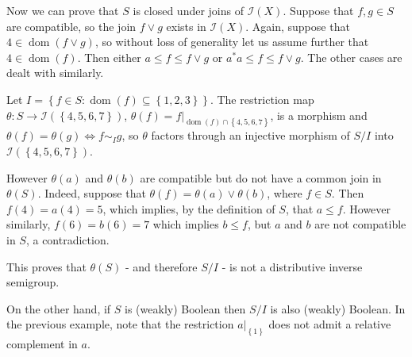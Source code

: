 \begin{example}
Now we can prove that $S$ is closed under joins of $\mathcal{I}(X)$. Suppose that $f,g\in S$ are compatible, so the join $f\lor g$ exists in $\mathcal{I}(X)$. Again, suppose that $4\in\operatorname{dom}(f\lor g)$, so without loss of generality let us assume further that $4\in\operatorname{dom}(f)$. Then either $a\leq f\leq f\lor g$ or $a^*a\leq f\leq f\lor g$. The other cases are dealt with similarly.

Let $I=\left\{f\in S:\operatorname{dom}(f)\subseteq\left\{1,2,3\right\}\right\}$. The restriction map $\theta:S\to\mathcal{I}(\left\{4,5,6,7\right\})$, $\theta(f)=f|_{\operatorname{dom}(f)\cap\left\{4,5,6,7\right\}}$, is a morphism and $\theta(f)=\theta(g)\iff f\sim_I g$, so $\theta$ factors through an injective morphism of $S/I$ into $\mathcal{I}(\left\{4,5,6,7\right\})$. 

However $\theta(a)$ and $\theta(b)$ are compatible but do not have a common join in $\theta(S)$. Indeed, suppose that $\theta(f)=\theta(a)\lor\theta(b)$, where $f\in S$. Then $f(4)=a(4)=5$, which implies, by the definition of $S$, that $a\leq f$. However similarly, $f(6)=b(6)=7$ which implies $b\leq f$, but $a$ and $b$ are not compatible in $S$, a contradiction.

This proves that $\theta(S)$ - and therefore $S/I$ - is not a distributive inverse semigroup.
\end{example}

On the other hand, if $S$ is (weakly) Boolean then $S/I$ is also (weakly) Boolean. In the previous example, note that the restriction $a|_{\left\{1\right\}}$ does not admit a relative complement in $a$.

